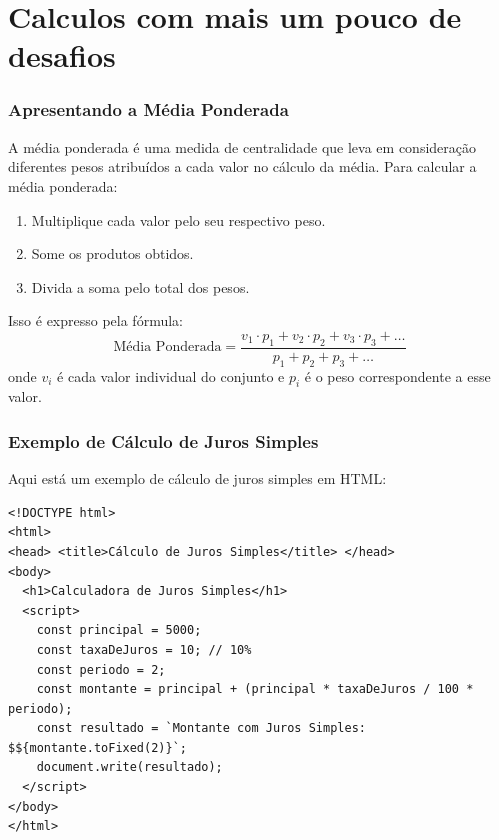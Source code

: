 \documentclass[13pt, xcolor={dvipsnames,svgnames}, portuguese]{beamer}
\begin{document}
\section{Calculos com mais um pouco de desafios}
\begin{frame}
\frametitle{Apresentando a Média Ponderada}
A média ponderada é uma medida de centralidade que leva em consideração diferentes pesos atribuídos a cada valor no cálculo da média.
\vspace{0.5cm}
Para calcular a média ponderada:

\begin{enumerate}
\item Multiplique cada valor pelo seu respectivo peso.
\item Some os produtos obtidos.
\item Divida a soma pelo total dos pesos.
\end{enumerate}

\vspace{0.5cm}

Isso é expresso pela fórmula:
\[
\text{Média Ponderada} = \frac{v_1 \cdot p_1 + v_2 \cdot p_2 + v_3 \cdot p_3 + \ldots}{p_1 + p_2 + p_3 + \ldots}
\]
onde $v_i$ é cada valor individual do conjunto e $p_i$ é o peso correspondente a esse valor.

\end{frame}
\begin{frame}[fragile]
\frametitle{Exemplo de Cálculo de Juros Simples}

Aqui está um exemplo de cálculo de juros simples em HTML:

\begin{verbatim}
<!DOCTYPE html>
<html>
<head> <title>Cálculo de Juros Simples</title> </head>
<body>
  <h1>Calculadora de Juros Simples</h1>
  <script>
    const principal = 5000;
    const taxaDeJuros = 10; // 10%
    const periodo = 2;
    const montante = principal + (principal * taxaDeJuros / 100 * periodo);
    const resultado = `Montante com Juros Simples: $${montante.toFixed(2)}`;
    document.write(resultado);
  </script>
</body>
</html>
\end{verbatim}

\end{frame}
\end{document}
